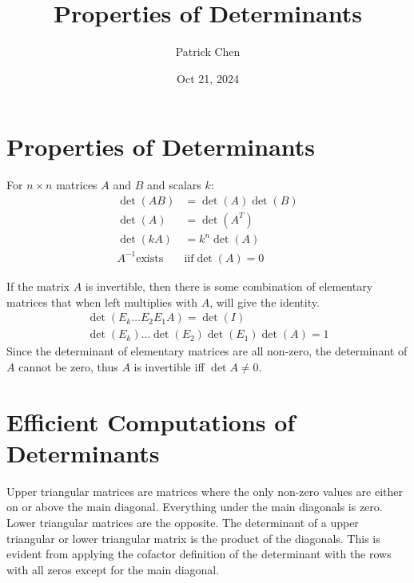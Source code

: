\documentclass{article}
\title{Properties of Determinants}
\author{Patrick Chen}
\date{Oct 21, 2024}
\theoremstyle{mytheoremstyle}
\theoremstyle{mytheoremstyle}
\theoremstyle{myproblemstyle}
\begin{document}
    \maketitle
    \section*{Properties of Determinants}
    For $n\times n$ matrices $A$ and $B$ and scalars $k$:
    \begin{align*}
        \det(AB) &= \det(A)\det(B) \\
        \det(A)  &= \det(A^T) \\
        \det(kA) &= k^n\det(A) \\
        A^{-1} \text{exists }&\text{iif} \det(A)=0
    \end{align*}

    If the matrix $A$ is invertible, then there is some combination of elementary matrices
    that when left multiplies with $A$, will give the identity.
    \begin{align*}
        \det(E_k\dots E_2E_1A) = \det(I) \\
        \det(E_k)\dots\det(E_2)\det(E_1)\det(A) = 1
    \end{align*}
    Since the determinant of elementary matrices are all non-zero, the
    determinant of $A$ cannot be zero, thus $A$ is invertible iff $\det A\ne0$.

    \section*{Efficient Computations of Determinants}
    Upper triangular matrices are matrices where the only non-zero values are
    either on or above the main diagonal. Everything under the main diagonals is
    zero. Lower triangular matrices are the opposite. The determinant of a upper
    triangular or lower triangular matrix is the product of the diagonals. This
    is evident from applying the cofactor definition of the determinant with the
    rows with all zeros except for the main diagonal.
\end{document}
